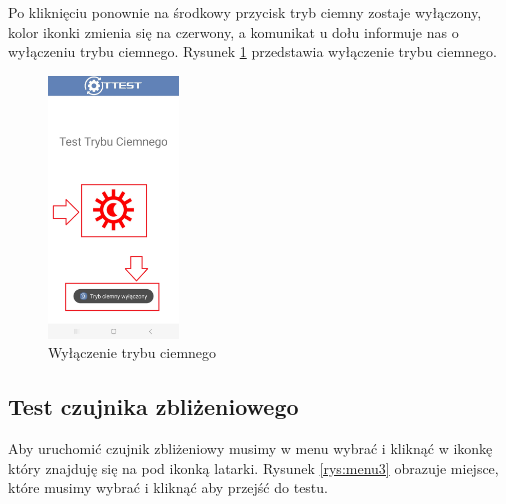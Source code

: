 Po kliknięciu ponownie na środkowy przycisk tryb ciemny zostaje wyłączony, kolor ikonki zmienia się na czerwony, a komunikat u dołu informuje nas o wyłączeniu trybu ciemnego. Rysunek \ref{rys:tryb ciemny1} przedstawia wyłączenie trybu ciemnego. 

\begin{figure}[!hbt]
	\begin{center}
		\includegraphics[angle=360, width=0.31\textwidth]{rys/punkt6/tryb ciemny1.png}
		\caption{Wyłączenie trybu ciemnego}
		\label{rys:tryb ciemny1}
	\end{center}
\end{figure}

\newpage


\subsection{Test czujnika zbliżeniowego}

\hspace{0.60cm}Aby uruchomić czujnik zbliżeniowy musimy w menu wybrać i kliknąć w ikonkę który znajduję się na pod ikonką latarki. Rysunek \ref{rys:menu3} obrazuje miejsce, które musimy wybrać i kliknąć aby przejść do testu.

